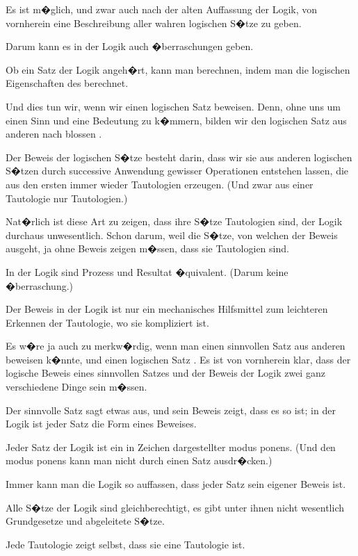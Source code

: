 {Es ist m�glich, und zwar auch nach der alten
Auffassung der Logik, von vornherein eine Beschreibung
aller \glqq{}wahren\grqq{} logischen S�tze zu geben.}


{Darum kann es in der Logik auch  �berraschungen
geben.}


{Ob ein Satz der Logik angeh�rt, kann man
berechnen, indem man die logischen Eigenschaften
des  berechnet.

Und dies tun wir, wenn wir einen logischen
Satz \glqq{}beweisen\grqq{}. Denn, ohne uns um einen Sinn
und eine Bedeutung zu k�mmern, bilden wir den
logischen Satz aus anderen nach blossen .

Der Beweis der logischen S�tze besteht darin,
dass wir sie aus anderen logischen S�tzen durch
successive Anwendung gewisser Operationen entstehen
lassen, die aus den ersten immer wieder
Tautologien erzeugen. (Und zwar  aus
einer Tautologie nur Tautologien.)

Nat�rlich ist diese Art zu zeigen, dass ihre
S�tze Tautologien sind, der Logik durchaus unwesentlich.
Schon darum, weil die S�tze, von
welchen der Beweis ausgeht, ja ohne Beweis zeigen
m�ssen, dass sie Tautologien sind.}


{In der Logik sind Prozess und Resultat �quivalent.
(Darum keine �berraschung.)}


{Der Beweis in der Logik ist nur ein mechanisches
Hilfsmittel zum leichteren Erkennen der
Tautologie, wo sie kompliziert ist.}


{Es w�re ja auch zu merkw�rdig, wenn man
einen sinnvollen Satz  aus anderen beweisen
k�nnte, und einen logischen Satz .
Es ist von vornherein klar, dass der logische
Beweis eines sinnvollen Satzes und der Beweis 
der Logik zwei ganz verschiedene Dinge sein
m�ssen.}


{Der sinnvolle Satz sagt etwas aus, und sein
Beweis zeigt, dass es so ist; in der Logik ist jeder
Satz die Form eines Beweises.

Jeder Satz der Logik ist ein in Zeichen dargestellter
modus ponens. (Und den modus ponens
kann man nicht durch einen Satz ausdr�cken.)}


{Immer kann man die Logik so auffassen, dass
jeder Satz sein eigener Beweis ist.}


{Alle S�tze der Logik sind gleichberechtigt, es
gibt unter ihnen nicht wesentlich Grundgesetze
und abgeleitete S�tze.

Jede Tautologie zeigt selbst, dass sie eine
Tautologie ist.}



